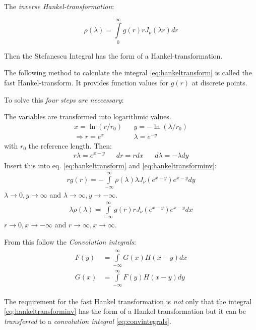 The \textit{inverse Hankel-transformation}:

\begin{equation}
\rho(\lambda)=\int\limits_{0}^{\infty}g(r)rJ_\nu(\lambda r)dr
\label{eq:hankeltransforminv}
\end{equation}

Then the Stefanescu Integral has the form of a Hankel-transformation. 


The following method to calculate the integral \eqref{eq:hankeltransform} is called the fast Hankel-transform. It provides function values for $g(r)$ at discrete points.

To solve this \textit{four steps are neccessary}:
\begin{compactenum}[1)]
\item The variables are transformed into logarithmic values.
\begin{align*}
x=\ln(r/r_0) && y=-\ln(\lambda/r_0)\\
\Rightarrow r=e^x && \lambda=e^{-y}
\end{align*}
with $r_0$ the reference length. Then:
\begin{align*}
r\lambda=e^{x-y} && dr=rdx && d\lambda=-\lambda dy
\end{align*}
Insert this into eq. \eqref{eq:hankeltransform} and \eqref{eq:hankeltransforminv}:
\begin{align*}
rg(r)=-\int\limits_{-\infty}^{\infty}\rho(\lambda)\lambda J_\nu(e^{x-y})e^{x-y} dy
\end{align*}
$\lambda\rightarrow 0, y\rightarrow \infty$ and $\lambda\rightarrow \infty, y\rightarrow -\infty$.
\begin{align*}
\lambda\rho(\lambda)=\int\limits_{-\infty}^{\infty}g(r)r J_\nu(e^{x-y})e^{x-y} dx
\end{align*}
$r\rightarrow 0, x\rightarrow -\infty$ and $ r\rightarrow \infty, x\rightarrow \infty$.

From this follow the \textit{Convolution integrals}:
\begin{align}
\begin{split}
\label{eq:convintegrals}
F(y)&=\int\limits_{-\infty}^{\infty}G(x)H(x-y)dx\\
G(x)&=\int\limits_{-\infty}^{\infty}F(y)H(x-y)dy
\end{split}
\end{align}

The requirement for the fast Hankel transformation is \textit{not} only that the integral \eqref{eq:hankeltransforminv} has the form of a Hankel transformation but it can be \textit{transferred} to a \textit{convolution integral} \eqref{eq:convintegrals}.\\



\end{compactenum}
